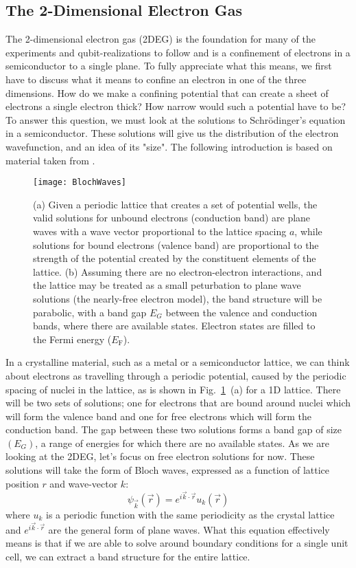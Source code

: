 \subsection{The 2-Dimensional Electron Gas}
\label{sec:2deg}
The 2-dimensional electron gas (2DEG) is the foundation for many of the experiments and qubit-realizations to follow and
is a confinement of electrons in a semiconductor to a single plane. To fully
appreciate what this means, we first have to discuss what it means to confine an electron in one of the three dimensions.
How do we make a confining potential that can create a sheet of electrons a single electron thick? How narrow
would such a potential have to be? To answer this question, we must look at the solutions
to Schrödinger's equation in a semiconductor. These solutions will give us the distribution of the electron wavefunction, and
an idea of its "size". The following introduction is based on material taken from \cite{delftbook, ihnbook, Ashcroft}.

\begin{figure}
  \texttt{[image: BlochWaves]}
  \caption[Bloch waves on a regular lattice]
  {(a) Given a periodic lattice that creates a set of potential wells, the valid solutions for unbound
   electrons (conduction band) are plane waves with a wave vector proportional to the lattice spacing $a$,
   while solutions for bound electrons (valence band) are proportional to the strength of the potential created
   by the constituent elements of the lattice. (b) Assuming there are no electron-electron interactions,
   and the lattice may be treated as a small peturbation to plane wave solutions (the nearly-free electron model),
   the band structure will be parabolic, with a band gap $E_G$ between the valence and conduction bands, where there are
   available states. Electron states are filled to the Fermi energy ($E_\textrm{F}$).}
  \label{fig:blochwaves}
\end{figure}

In a crystalline material, such as a metal or a semiconductor lattice, we can think
about electrons as travelling through a periodic potential, caused by the periodic spacing of nuclei in the lattice, as
is shown in Fig.~\ref{fig:blochwaves}~(a) for a 1D lattice. There will be two sets of solutions; one for electrons
that are bound around nuclei which will form the valence band and one for free electrons which
will form the conduction band. The gap between these two solutions forms a band gap of size $(E_G)$, a range
of energies for which there are no available states. As we are looking at the 2DEG, let's focus on free electron solutions for now.
These solutions will take the form of Bloch waves, expressed as a function of lattice position $r$ and wave-vector $k$:
\begin{equation}
  \psi_{\vec{k}}(\vec{r}) = e^{i\vec{k} \cdot \vec{r}}u_k(\vec{r})
\end{equation}
where $u_k$ is a periodic function with the same periodicity as the crystal lattice and $e^{i\vec{k} \cdot \vec{r}}$ are
the general form of plane waves. What this equation effectively means is that if we are able to solve around boundary conditions for
a single unit cell, we can extract a band structure for the entire lattice.


